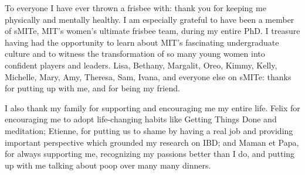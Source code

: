 \begin{singlespace}
To everyone I have ever thrown a frisbee with: thank you for keeping me physically and mentally healthy. I am especially grateful to have been a member of sMITe, MIT's women's ultimate frisbee team, during my entire PhD. I treasure having had the opportunity to learn about MIT's fascinating undergraduate culture and to witness the transformation of so many young women into confident players and leaders. Lisa, Bethany, Margalit, Oreo, Kimmy, Kelly, Michelle, Mary, Amy, Theresa, Sam, Ivana, and everyone else on sMITe: thanks for putting up with me, and for being my friend.

I also thank my family for supporting and encouraging me my entire life. Felix for encouraging me to adopt life-changing habits like Getting Things Done and meditation; Etienne, for putting us to shame by having a real job and providing important perspective which grounded my research on IBD; and Maman et Papa, for always supporting me, recognizing my passions better than I do, and putting up with me talking about poop over many many dinners.

\end{singlespace}
